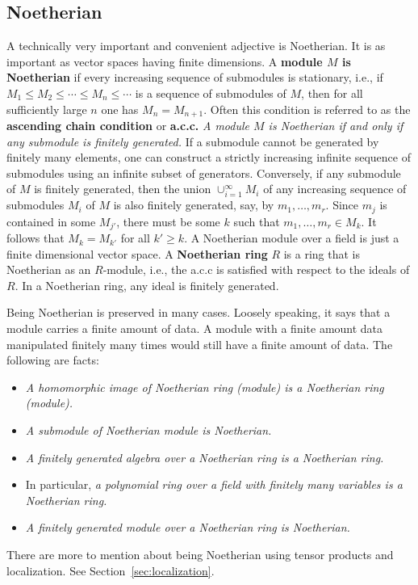 \subsection*{Noetherian}

A technically very important and convenient adjective is Noetherian.
It is as important as vector spaces having finite dimensions.
A {\bf module $M$ is Noetherian} if every increasing sequence of submodules is stationary,
i.e., if $M_1 \le M_2 \le \cdots \le M_n \le \cdots$ is a sequence of submodules of $M$,
then for all sufficiently large $n$ one has $M_n = M_{n+1}$.
Often this condition is referred to as the {\bf ascending chain condition} or {\bf a.c.c.}
{\em A module $M$ is Noetherian if and only if any submodule is finitely generated.}
If a submodule cannot be generated by finitely many elements, 
one can construct a strictly increasing infinite sequence of submodules
using an infinite subset of generators.
Conversely, if any submodule of $M$ is finitely generated,
then the union $\cup_{i=1}^\infty M_i$ of any increasing sequence of submodules $M_i$ of $M$
is also finitely generated, say, by $m_1,\ldots,m_r$.
Since $m_j$ is contained in some $M_{j'}$, there must be some $k$ such that $m_1,\ldots,m_r \in M_k$.
It follows that $M_k = M_{k'}$ for all $k' \ge k$.
A Noetherian module over a field is just a finite dimensional vector space.
A {\bf Noetherian ring} $R$ is a ring that is Noetherian as an $R$-module,
i.e., the a.c.c is satisfied with respect to the ideals of $R$.
In a Noetherian ring, any ideal is finitely generated.


Being Noetherian is preserved in many cases.
Loosely speaking, it says that a module carries a finite amount of data.
A module with a finite amount data manipulated finitely many times would still have a finite amount of data.
The following are facts:
\begin{itemize}
\item {\em A homomorphic image of Noetherian ring (module) is a Noetherian ring (module).}
\item {\em A submodule of Noetherian module is Noetherian.}
\item {\em A finitely generated algebra over a Noetherian ring is a Noetherian ring.}
\item In particular, {\em a polynomial ring over a field with finitely many variables is a Noetherian ring.}
\item {\em A finitely generated module over a Noetherian ring is Noetherian.}
\end{itemize}
There are more to mention about being Noetherian using tensor products and localization.
See Section~\ref{sec:localization}.

